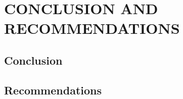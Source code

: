 
\chapter{CONCLUSION AND RECOMMENDATIONS} \label{chap:conclusion}


\section{Conclusion}\label{sec:conclusion}



\section{Recommendations}\label{sec:recommendations}

